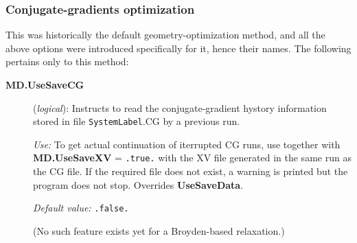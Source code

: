 \documentclass[11pt]{article}
\begin{document}
\subsubsection{Conjugate-gradients optimization}

This was historically the default geometry-optimization method, and
all the above options were introduced specifically for it, hence their
names. The following pertains only to this method:

\begin{description}
\item[{\bf MD.UseSaveCG}] ({\it logical}): 
Instructs to read the conjugate-gradient hystory information stored
in file {\tt SystemLabel}.CG by a previous run.

{\it Use:} To get actual continuation of iterrupted CG runs, use
together with {\bf MD.UseSaveXV} = {\tt .true.} with the XV
file generated in the same run as the CG file.
If the required file does not exist, a warning is
printed but the program does not stop. Overrides {\bf UseSaveData}.

{\it Default value:} {\tt .false.}

(No such feature exists yet for a Broyden-based relaxation.)

\end{description}        
\end{document}
